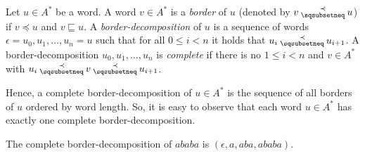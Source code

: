 \begin{definition}
	Let $u\in A^\ast$ be a word. A word $v\in A^*$ is a \emph{border} of $u$ (denoted by $v\presuf u$) if $v \preceq u$ and $v \sqsubseteq u$. A \emph{border-decomposition} of $u$ is a sequence of words $\epsilon = u_0,u_1,\ldots, u_n = u$ such that for all $0\leq i < n$ it holds that
	$u_i \presuf u_{i+1}$. A border-decomposition $u_0,u_1,\ldots, u_n $ is \emph{complete} if there is no $1\leq i< n$ and $v\in A^\ast$ with $u_i \presuf v \presuf u_{i+1}$.
\end{definition}

Hence, a complete border-decomposition of $u\in A^*$ is the sequence of all borders of $u$ ordered by word length. So, it is easy to observe that each word $u\in A^*$ has exactly one complete border-decomposition.


\begin{example}
	The  complete border-decomposition of $ababa$ is $(\epsilon, a, aba, ababa)$.
\end{example}

%

